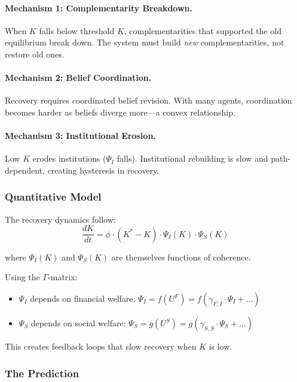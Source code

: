 \paragraph{Mechanism 1: Complementarity Breakdown.}
When $K$ falls below threshold $\underline{K}$, complementarities that 
supported the old equilibrium break down. The system must build \emph{new} 
complementarities, not restore old ones.

\paragraph{Mechanism 2: Belief Coordination.}
Recovery requires coordinated belief revision. With many agents, coordination 
becomes harder as beliefs diverge more---a convex relationship.

\paragraph{Mechanism 3: Institutional Erosion.}
Low $K$ erodes institutions ($\Psi_I$ falls). Institutional rebuilding is 
slow and path-dependent, creating hysteresis in recovery.

\subsubsection{Quantitative Model}

The recovery dynamics follow:
\begin{equation}
\frac{dK}{dt} = \phi \cdot (K^* - K) \cdot \Psi_I(K) \cdot \Psi_S(K)
\label{eq:recovery-dynamics}
\end{equation}

where $\Psi_I(K)$ and $\Psi_S(K)$ are themselves functions of coherence.

Using the $\Gamma$-matrix:
\begin{itemize}
  \item $\Psi_I$ depends on financial welfare: $\Psi_I = f(U^F) = f(\gamma_{F,I} \cdot \Psi_I + \ldots)$
  \item $\Psi_S$ depends on social welfare: $\Psi_S = g(U^S) = g(\gamma_{S,S} \cdot \Psi_S + \ldots)$
\end{itemize}

This creates feedback loops that slow recovery when $K$ is low.

\subsubsection{The Prediction}

